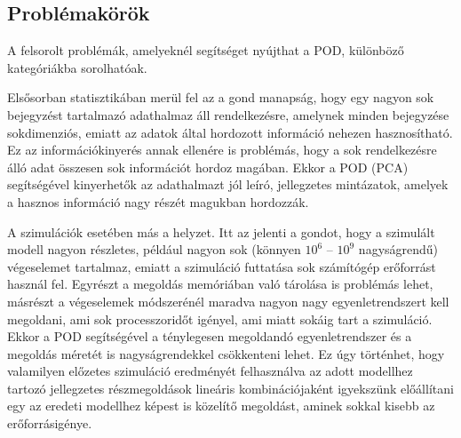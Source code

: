         \subsection{Problémakörök}
            A felsorolt problémák, amelyeknél segítséget nyújthat a POD, különböző kategóriákba sorolhatóak.
            \par
            Elsősorban statisztikában merül fel az a gond manapság, hogy egy nagyon sok bejegyzést tartalmazó adathalmaz áll rendelkezésre, amelynek minden bejegyzése sokdimenziós, emiatt az adatok által hordozott információ nehezen hasznosítható. Ez az információkinyerés annak ellenére is problémás, hogy a sok rendelkezésre álló adat összesen sok információt hordoz magában. Ekkor a POD (PCA) segítségével kinyerhetők az adathalmazt jól leíró, jellegzetes mintázatok, amelyek a hasznos információ nagy részét magukban hordozzák.
            \par
            A szimulációk esetében más a helyzet. Itt az jelenti a gondot, hogy a szimulált modell nagyon részletes, például nagyon sok (könnyen $10^6$ -- $10^9$ nagyságrendű) végeselemet tartalmaz, emiatt a szimuláció futtatása sok számítógép erőforrást használ fel. Egyrészt a megoldás memóriában való tárolása is problémás lehet, másrészt a végeselemek módszerénél maradva nagyon nagy egyenletrendszert kell megoldani, ami sok processzoridőt igényel, ami miatt sokáig tart a szimuláció. Ekkor a POD segítségével a ténylegesen megoldandó egyenletrendszer és a megoldás méretét is nagyságrendekkel csökkenteni lehet. Ez úgy történhet, hogy valamilyen előzetes szimuláció eredményét felhasználva az adott modellhez tartozó jellegzetes részmegoldások lineáris kombinációjaként igyekszünk előállítani egy az eredeti modellhez képest is közelítő megoldást, aminek sokkal kisebb az erőforrásigénye.
